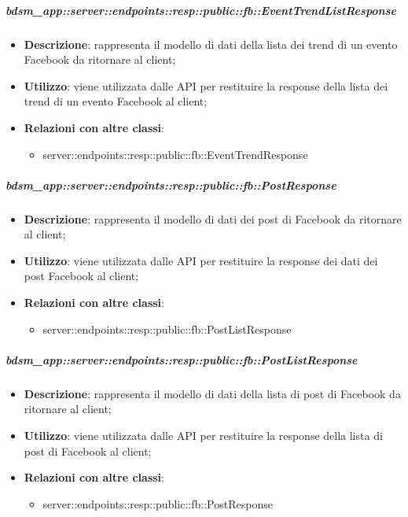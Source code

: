     \subparagraph{bdsm\_app::server::endpoints::resp::public::fb::EventTrendListResponse} %
    \label{subp:bdsm_app_server_endpoints_resp_public_fb_eventtrendlistresponse}
    \begin{itemize}
      \item \textbf{Descrizione}: rappresenta il modello di dati della lista dei trend di un evento Facebook da ritornare al client;
      \item \textbf{Utilizzo}: viene utilizzata dalle API per restituire la response della lista dei trend di un evento Facebook al client;
      \item \textbf{Relazioni con altre classi}:
        \begin{itemize}
          \item server::endpoints::resp::public::fb::EventTrendResponse
        \end{itemize}
      \end{itemize}
    
    \subparagraph{bdsm\_app::server::endpoints::resp::public::fb::PostResponse} %
    \label{subp:bdsm_app_server_endpoints_resp_public_fb_postresponse}
    \begin{itemize}
      \item \textbf{Descrizione}: rappresenta il modello di dati dei post di Facebook da ritornare al client;
      \item \textbf{Utilizzo}: viene utilizzata dalle API per restituire la response dei dati dei post Facebook al client;
      \item \textbf{Relazioni con altre classi}:
        \begin{itemize}
          \item server::endpoints::resp::public::fb::PostListResponse
        \end{itemize}
      \end{itemize}
    
    \subparagraph{bdsm\_app::server::endpoints::resp::public::fb::PostListResponse} %
    \label{subp:bdsm_app_server_endpoints_resp_public_fb_postlistresponse}
    \begin{itemize}
      \item \textbf{Descrizione}: rappresenta il modello di dati della lista di post di Facebook da ritornare al client;
      \item \textbf{Utilizzo}: viene utilizzata dalle API per restituire la response della lista di post di Facebook al client;
      \item \textbf{Relazioni con altre classi}:
        \begin{itemize}
          \item server::endpoints::resp::public::fb::PostResponse
        \end{itemize}
      \end{itemize}

